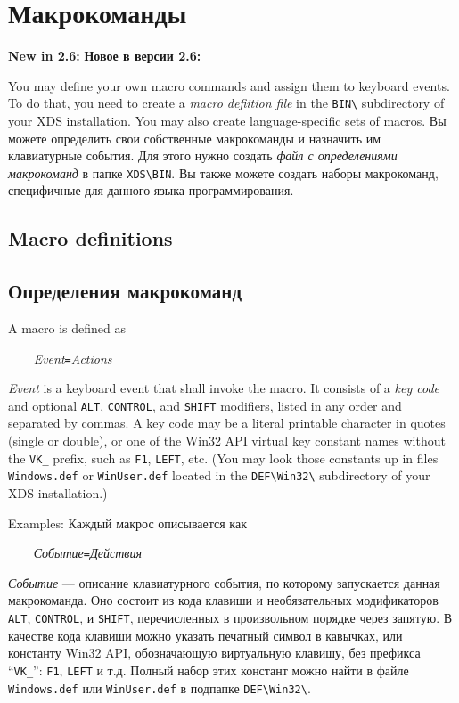 \section{Макрокоманды}
 \fi
{}

\ifenglish
{\bf New in 2.6:}
\else
{\bf Новое в версии 2.6:}
\fi

\ifenglish
You may define your own macro commands and assign them to keyboard events.
To do that, you need to create a {\it macro defiition file} in the \verb'BIN\'
subdirectory of your XDS installation. 
You may also create language-specific sets of macros.
\else
Вы можете определить свои собственные макрокоманды и назначить им клавиатурные события.
Для этого нужно создать {\it файл с определениями макрокоманд} в папке \verb'XDS\BIN'.
Вы также можете создать наборы макрокоманд, специфичные для данного языка 
программирования.
\fi

\ifenglish
\subsection{Macro definitions}
\else
\subsection{Определения макрокоманд}
\fi

\ifenglish
A macro is defined as

\verb'    '{\it Event}\verb'='{\it Actions}

{\it Event} is a keyboard event that shall invoke the macro.
It consists of a {\it key code} and optional \verb'ALT', \verb'CONTROL', and \verb'SHIFT' 
modifiers, listed in any order and separated by commas.
A key code may be a literal printable character in quotes (single or double),
or one of the Win32 API virtual key constant names without the \verb'VK_' prefix,
such as \verb'F1', \verb'LEFT', etc.
(You may look those constants up in files 
\verb'Windows.def' or \verb'WinUser.def' located in the \verb'DEF\Win32\' 
subdirectory of your XDS installation.)

Examples:
\else
Каждый макрос описывается как 

\verb'    '{\it Событие}\verb'='{\it Действия}

{\it Событие} --- описание клавиатурного события, по которому запускается 
данная макрокоманда. Оно состоит из кода клавиши и необязательных модификаторов
\verb'ALT', \verb'CONTROL', и \verb'SHIFT', перечисленных в произвольном порядке 
через запятую. 
В качестве кода клавиши можно указать печатный символ в кавычках, или 
константу Win32 API, обозначающую виртуальную клавишу,
без префикса ``\verb'VK_''': \verb'F1', \verb'LEFT' и т.д. 
Полный набор этих констант можно найти в файле \verb'Windows.def' или
\verb'WinUser.def' в подпапке \verb'DEF\Win32\'.

